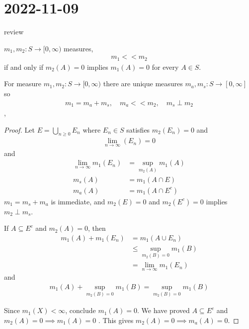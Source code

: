 \section{2022-11-09}

review

\begin{definition}
	$m_1, m_2 : S \to [0, \infty)$ measures,
	\begin{align*}
		m_1 << m_2
	\end{align*} if and only if $m_{2} (A) = 0 $ implies $m_{1} (A) = 0$ for every $A \in S$.
\end{definition}


\begin{theorem}
	For measure $m_1, m_2 : S \to [0, \infty)$ there are unique measures  $m_a, m_{s} :S \to [0, \infty]$ so
	\begin{align*}
		m_1 = m_a + m_s, \quad m_a << m_2, \quad m_s \perp m_2
	\end{align*},
\end{theorem}

\begin{proof}
	Let $E = \bigcup_{n \geq 0} E_{n}$ where $E_{n} \in S$ satisfies 
	 $m_{2} (E_{n}) = 0$ and
	 \begin{align*}
	 	\lim_{n \to \infty} (E_{n}) = 0
	 \end{align*} and
	 \begin{align*}
		 \lim_{n \to \infty} m_{1} (E_{n}) &= \sup_{m_{2} (A)} m_1 (A) \\
		 m_s (A) &= m_1 (A \cap E) \\
		 m_a (A) &= m_{1} (A \cap E^c)
	 \end{align*} 
	 $m_1 = m_s + m_a$ is immediate, and
	 $m_2 (E) = 0$ and $m_2 (E^c) = 0$ implies $m_2 \perp m_s$.

	 If $A \subseteq E^c$ and $m_2 (A) = 0$, then 
	 \begin{align*}
		 m_1 (A) + m_1 (E_n) &= m_1 (A \cup E_n) \\
							 &\leq \sup_{m_2 (B) = 0} m_1 (B) \\
							 &= \lim_{n \to \infty} m_1 (E_n)
	 \end{align*} 
	 and 
	 \begin{align*}
	 	m_1 (A) + \sup_{m_2 (B) = 0} m_1 (B) = \sup_{m_2 (B) = 0} m_1 (B)
	 \end{align*} 

	 Since $m_1 (X) < \infty$, conclude $m_1 (A) = 0$.
	 We have proved  $A \subseteq  E^c$ and $m_2 (A) = 0 \implies m_1 (A) = 0$ .
	 This gives $m_2 (A) = 0 \implies m_a (A) = 0$.
\end{proof}

